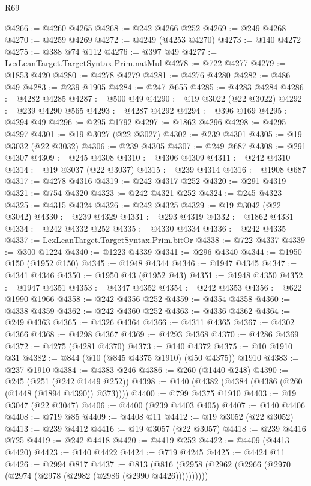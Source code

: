 \begin{lexlean}{R69}
\begin{coremodule}
{@4266 := @4260 @4265
@4268 := @242 @4266 @252
@4269 := @249 @4268
@4270 := @4259 @4269
@4272 := @4249 (@4253 @4270)
@4273 := @140 @4272
@4275 := @388 @74 @112
@4276 := @397 @49
@4277 := LexLeanTarget.TargetSyntax.Prim.natMul
@4278 := @722 @4277
@4279 := @1853 @420
@4280 := @4278 @4279
@4281 := @4276 @4280
@4282 := @486 @49
@4283 := @239 @1905
@4284 := @247 @655
@4285 := @4283 @4284
@4286 := @4282 @4285
@4287 := @500 @49
@4290 := @19 @3022 (@22 @3022)
@4292 := @239 @4290 @565
@4293 := @4287 @4292
@4294 := @396 @169
@4295 := @4294 @49
@4296 := @295 @1792
@4297 := @1862 @4296
@4298 := @4295 @4297
@4301 := @19 @3027 (@22 @3027)
@4302 := @239 @4301
@4305 := @19 @3032 (@22 @3032)
@4306 := @239 @4305
@4307 := @249 @687
@4308 := @291 @4307
@4309 := @245 @4308
@4310 := @4306 @4309
@4311 := @242 @4310
@4314 := @19 @3037 (@22 @3037)
@4315 := @239 @4314
@4316 := @1908 @687
@4317 := @4278 @4316
@4319 := @242 @4317 @252
@4320 := @291 @4319
@4321 := @754 @4320
@4323 := @242 @4321 @252
@4324 := @245 @4323
@4325 := @4315 @4324
@4326 := @242 @4325
@4329 := @19 @3042 (@22 @3042)
@4330 := @239 @4329
@4331 := @293 @4319
@4332 := @1862 @4331
@4334 := @242 @4332 @252
@4335 := @4330 @4334
@4336 := @242 @4335
@4337 := LexLeanTarget.TargetSyntax.Prim.bitOr
@4338 := @722 @4337
@4339 := @300 @1224
@4340 := @1223 @4339
@4341 := @296 @4340
@4344 := @1950 @150 (@1952 @150)
@4345 := @1948 @4344
@4346 := @1947 @4345
@4347 := @4341 @4346
@4350 := @1950 @43 (@1952 @43)
@4351 := @1948 @4350
@4352 := @1947 @4351
@4353 := @4347 @4352
@4354 := @242 @4353
@4356 := @622 @1990 @1966
@4358 := @242 @4356 @252
@4359 := @4354 @4358
@4360 := @4338 @4359
@4362 := @242 @4360 @252
@4363 := @4336 @4362
@4364 := @249 @4363
@4365 := @4326 @4364
@4366 := @4311 @4365
@4367 := @4302 @4366
@4368 := @4298 @4367
@4369 := @4293 @4368
@4370 := @4286 @4369
@4372 := @4275 (@4281 @4370)
@4373 := @140 @4372
@4375 := @10 @1910 @31
@4382 := @844 (@10 (@845 @4375 @1910) (@50 @4375)) @1910
@4383 := @237 @1910
@4384 := @4383 @246
@4386 := @260 (@1440 @248)
@4390 := @245 (@251 (@242 @1449 @252))
@4398 := @140 (@4382 (@4384 (@4386 (@260 (@1448 (@1894 @4390)) @373))))
@4400 := @799 @4375 @1910
@4403 := @19 @3047 (@22 @3047)
@4406 := @4400 (@239 @4403 @405)
@4407 := @140 @4406
@4408 := @719 @85
@4409 := @4408 @11
@4412 := @19 @3052 (@22 @3052)
@4413 := @239 @4412
@4416 := @19 @3057 (@22 @3057)
@4418 := @239 @4416 @725
@4419 := @242 @4418
@4420 := @4419 @252
@4422 := @4409 (@4413 @4420)
@4423 := @140 @4422
@4424 := @719 @4245
@4425 := @4424 @11
@4426 := @2994 @817
@4437 := @813 (@816 (@2958 (@2962 (@2966 (@2970 (@2974 (@2978 (@2982 (@2986 (@2990 @4426))))))))))
}
\end{coremodule}
\end{lexlean}
